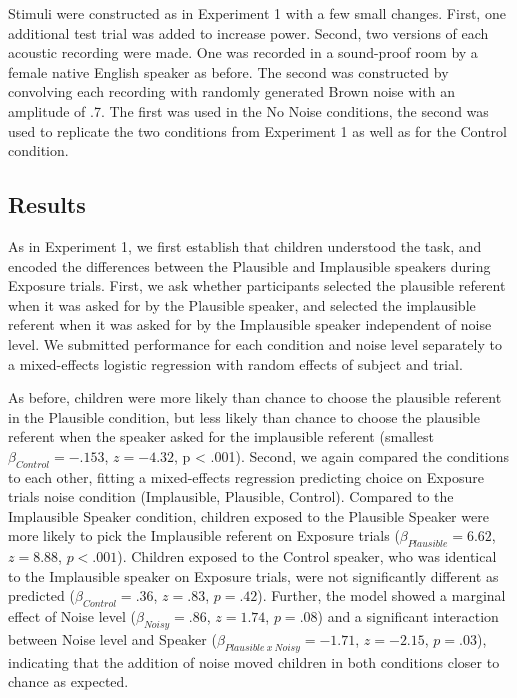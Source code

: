 \documentclass[man,floatsintext]{apa6}
\begin{document}
Stimuli were constructed as in Experiment 1 with a few small changes. First, one additional test trial was added to increase power. Second, two versions of each acoustic recording were made. One was recorded in a sound-proof room by a female native English speaker as before. The second was constructed by convolving each recording with randomly generated Brown noise with an amplitude of .7. The first was used in the No Noise conditions, the second was used to replicate the two conditions from Experiment 1 as well as for the Control condition.

\subsection{Results}

As in Experiment 1, we first establish that children understood the task, and encoded the differences between the Plausible and Implausible speakers during Exposure trials. First, we ask whether participants selected the plausible referent when it was asked for by the Plausible speaker, and selected the implausible referent when it was asked for by the Implausible speaker independent of noise level. We submitted performance for each condition and noise level separately to a mixed-effects logistic regression with random effects of subject and trial. 

As before, children were more likely than chance to choose the plausible referent in the Plausible condition, but less likely than chance to choose the plausible referent when the speaker asked for the implausible referent (smallest $\beta_{Control} = -.153$, $z = -4.32$, p < .001). Second, we again compared the conditions to each other, fitting a mixed-effects regression predicting choice on Exposure trials noise condition (Implausible, Plausible, Control). Compared to the Implausible Speaker condition, children exposed to the Plausible Speaker were more likely to pick the Implausible referent on Exposure trials ($\beta_{Plausible} = 6.62$,  $z = 8.88$, $p <.001$). Children exposed to the Control speaker, who was identical to the Implausible speaker on Exposure trials, were not significantly different as predicted ($\beta_{Control} = .36$,  $z = .83$, $p = .42$). Further, the model showed a marginal effect of Noise level ($\beta_{Noisy} = .86$,  $z = 1.74$, $p = .08$) and a significant interaction between Noise level and Speaker ($\beta_{Plausible \: x \: Noisy} = -1.71$, $z= -2.15$, $p = .03$), indicating that the addition of noise moved children in both conditions closer to chance as expected.
\end{document}
